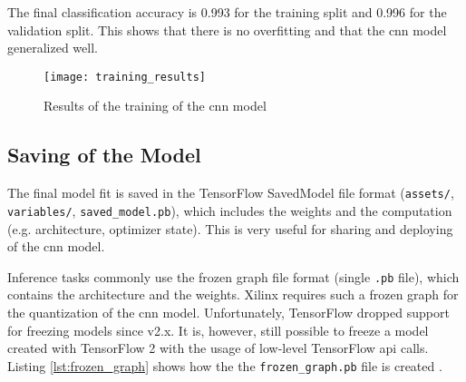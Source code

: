 The final classification accuracy is \num{0.993} for the training split and \num{0.996} for the validation split.
This shows that there is no overfitting and that the \acrshort{cnn} model generalized well.

\begin{figure}
  \centering
  \texttt{[image: training\_results]}
  \caption{Results of the training of the \acrshort{cnn} model}
  \label{fig:training_results}
\end{figure}

\subsection{Saving of the Model}
\label{subsec:training_of_the_cnn:training:saving_of_the_model}
The final model fit is saved in the TensorFlow SavedModel file format (\texttt{assets/}, \texttt{variables/}, \texttt{saved\_model.pb}), which includes the weights and the computation (e.g. architecture, optimizer state).
This is very useful for sharing and deploying of the \acrshort{cnn} model. %

Inference tasks commonly use the frozen graph file format (single \texttt{.pb} file), which contains the architecture and the weights.
Xilinx requires such a frozen graph for the quantization of the \acrshort{cnn} model.
Unfortunately, TensorFlow dropped support for freezing models since v2.x.
It is, however, still possible to freeze a model created with TensorFlow 2 with the usage of low-level TensorFlow \acrshort{api} calls.
Listing \ref{lst:frozen_graph} shows how the the \texttt{frozen\_graph.pb} file is created \cite{}. %

